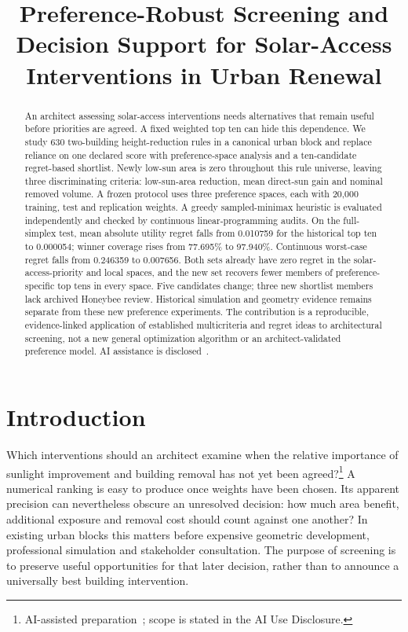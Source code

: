 \documentclass{llncs}
\newcommand{\aidraft}{\footnote{AI-assisted preparation~\cite{openai2026}; scope is stated in the AI Use Disclosure.}}
\begin{document}
\title{Preference-Robust Screening and Decision Support for Solar-Access Interventions in Urban Renewal}
\author{}\institute{}\maketitle{}
\begin{abstract}
An architect assessing solar-access interventions needs alternatives that remain useful before priorities are agreed. A fixed weighted top ten can hide this dependence. We study 630 two-building height-reduction rules in a canonical urban block and replace reliance on one declared score with preference-space analysis and a ten-candidate regret-based shortlist. Newly low-sun area is zero throughout this rule universe, leaving three discriminating criteria: low-sun-area reduction, mean direct-sun gain and nominal removed volume. A frozen protocol uses three preference spaces, each with 20,000 training, test and replication weights. A greedy sampled-minimax heuristic is evaluated independently and checked by continuous linear-programming audits. On the full-simplex test, mean absolute utility regret falls from 0.010759 for the historical top ten to 0.000054; winner coverage rises from 77.695\% to 97.940\%. Continuous worst-case regret falls from 0.246359 to 0.007656. Both sets already have zero regret in the solar-access-priority and local spaces, and the new set recovers fewer members of preference-specific top tens in every space. Five candidates change; three new shortlist members lack archived Honeybee review. Historical simulation and geometry evidence remains separate from these new preference experiments. The contribution is a reproducible, evidence-linked application of established multicriteria and regret ideas to architectural screening, not a new general optimization algorithm or an architect-validated preference model. AI assistance is disclosed~\cite{openai2026}.
\end{abstract}

\section{Introduction}
Which interventions should an architect examine when the relative importance of sunlight improvement and building removal has not yet been agreed?\aidraft{} A numerical ranking is easy to produce once weights have been chosen. Its apparent precision can nevertheless obscure an unresolved decision: how much area benefit, additional exposure and removal cost should count against one another? In existing urban blocks this matters before expensive geometric development, professional simulation and stakeholder consultation. The purpose of screening is to preserve useful opportunities for that later decision, rather than to announce a universally best building intervention.
\end{document}
